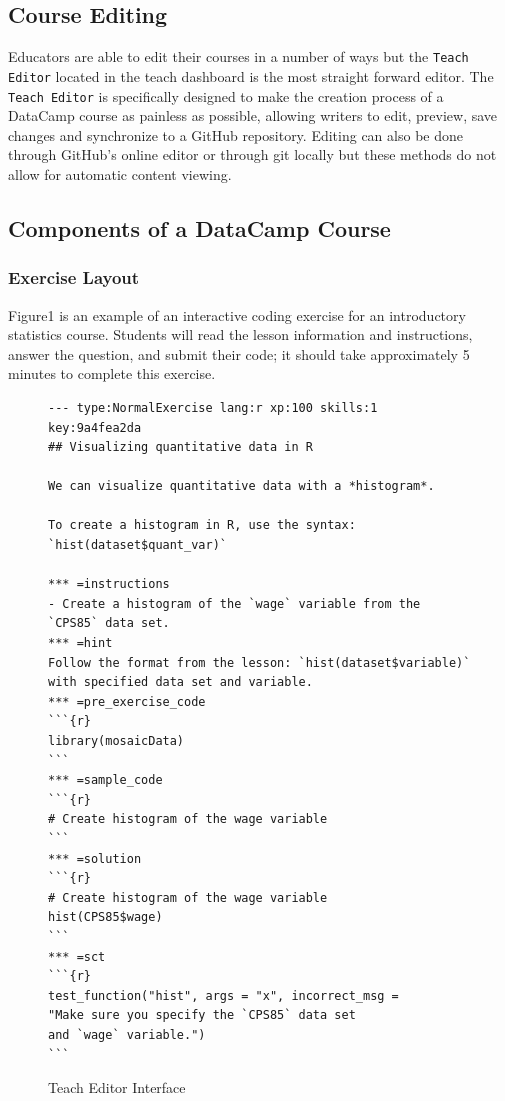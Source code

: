 \documentclass[12pt]{article}\usepackage[]{graphicx}\usepackage[]{color}
\begin{document}
\subsection{Course Editing}
Educators are able to edit their courses in a number of ways but the \texttt{Teach Editor} located in the teach dashboard is the
most straight forward editor. The \texttt{Teach Editor} is specifically designed to make the creation process of a DataCamp course
as painless as possible, allowing writers to edit, preview, save changes and synchronize to a GitHub repository. Editing can
also be done through GitHub's online editor or through git locally but these methods do not allow for automatic content
viewing.
\subsection{Components of a DataCamp Course}
\subsubsection{Exercise Layout}
Figure1 is an example of an interactive coding exercise for an introductory statistics course. Students will read the lesson information and instructions, answer the question, and submit their code; it should take approximately 5 minutes to complete this exercise.
\begin{figure}
\caption{Teach Editor Interface}
\begin{Verbatim}[frame=single]
--- type:NormalExercise lang:r xp:100 skills:1 key:9a4fea2da
## Visualizing quantitative data in R

We can visualize quantitative data with a *histogram*.

To create a histogram in R, use the syntax:
`hist(dataset$quant_var)`

*** =instructions
- Create a histogram of the `wage` variable from the 
`CPS85` data set.
*** =hint
Follow the format from the lesson: `hist(dataset$variable)`
with specified data set and variable.
*** =pre_exercise_code
```{r}
library(mosaicData)
```
*** =sample_code
```{r}
# Create histogram of the wage variable
```
*** =solution
```{r}
# Create histogram of the wage variable 
hist(CPS85$wage)
```
*** =sct
```{r}
test_function("hist", args = "x", incorrect_msg = 
"Make sure you specify the `CPS85` data set
and `wage` variable.")
```
\end{Verbatim}
\label{fig:code1}
\end{figure}
\end{document}
